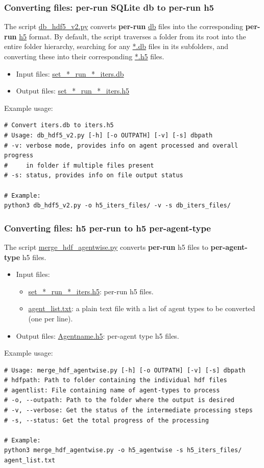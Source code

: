 \documentclass[10pt,a4paper]{article}
\begin{document}
\subsubsection{Converting files: per-run SQLite db to per-run h5}
The script \url{db_hdf5_v2.py} converts \textbf{per-run} \url{db} files into the corresponding \textbf{per-run} \url{h5} format. By default, the script traverses a folder from its root into the entire folder hierarchy, searching for any \url{*.db} files in its subfolders, and converting these into their corresponding \url{*.h5} files.
\begin{itemize}
\item Input files: \url{set_*_run_*_iters.db}

\item Output files: \url{set_*_run_*_iters.h5}
\end{itemize}

Example usage:
\begin{verbatim}
# Convert iters.db to iters.h5
# Usage: db_hdf5_v2.py [-h] [-o OUTPATH] [-v] [-s] dbpath
# -v: verbose mode, provides info on agent processed and overall progress
#     in folder if multiple files present
# -s: status, provides info on file output status

# Example:
python3 db_hdf5_v2.py -o h5_iters_files/ -v -s db_iters_files/
\end{verbatim}

\subsubsection{Converting files: h5 per-run to h5 per-agent-type}
The script \url{merge_hdf_agentwise.py} converts \textbf{per-run} h5 files to \textbf{per-agent-type} h5 files.
\begin{itemize}
\item Input files: 
	\begin{itemize}
	\item \url{set_*_run_*_iters.h5}: per-run h5 files.
	\item \url{agent_list.txt}: a plain text file with a list of agent types to be converted (one per line).
	\end{itemize}
\item Output files: \url{Agentname.h5}: per-agent type h5 files.
\end{itemize}

Example usage:
\begin{verbatim}
# Usage: merge_hdf_agentwise.py [-h] [-o OUTPATH] [-v] [-s] dbpath
# hdfpath: Path to folder containing the individual hdf files
# agentlist: File containing name of agent-types to process
# -o, --outpath: Path to the folder where the output is desired
# -v, --verbose: Get the status of the intermediate processing steps
# -s, --status: Get the total progress of the processing

# Example:
python3 merge_hdf_agentwise.py -o h5_agentwise -s h5_iters_files/ agent_list.txt
\end{verbatim}
\end{document}
